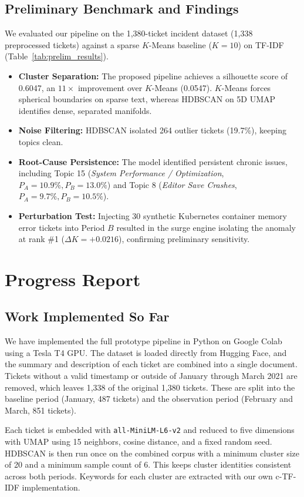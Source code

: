 \documentclass[sigconf,nonacm]{acmart}
\begin{document}
\subsection{Preliminary Benchmark and Findings}
We evaluated our pipeline on the 1,380-ticket incident dataset (1,338 preprocessed tickets) against a sparse $K$-Means baseline ($K = 10$) on TF-IDF (Table~\ref{tab:prelim_results}).
\begin{itemize}
    \item \textbf{Cluster Separation:} The proposed pipeline achieves a silhouette score of 0.6047, an $11\times$ improvement over $K$-Means (0.0547). $K$-Means forces spherical boundaries on sparse text, whereas HDBSCAN on 5D UMAP identifies dense, separated manifolds.
    \item \textbf{Noise Filtering:} HDBSCAN isolated 264 outlier tickets (19.7\%), keeping topics clean.
    \item \textbf{Root-Cause Persistence:} The model identified persistent chronic issues, including Topic 15 (\textit{System Performance / Optimization}, $P_A = 10.9\%, P_B = 13.0\%$) and Topic 8 (\textit{Editor Save Crashes}, $P_A = 9.7\%, P_B = 10.5\%$).
    \item \textbf{Perturbation Test:} Injecting 30 synthetic Kubernetes container memory error tickets into Period $B$ resulted in the surge engine isolating the anomaly at rank \#1 ($\Delta K = +0.0216$), confirming preliminary sensitivity.
\end{itemize}

\section{Progress Report}

\subsection{Work Implemented So Far}
We have implemented the full prototype pipeline in Python on Google Colab using a Tesla T4 GPU. The dataset is loaded directly from Hugging Face, and the summary and description of each ticket are combined into a single document. Tickets without a valid timestamp or outside of January through March 2021 are removed, which leaves 1,338 of the original 1,380 tickets. These are split into the baseline period (January, 487 tickets) and the observation period (February and March, 851 tickets).

Each ticket is embedded with \texttt{all-MiniLM-L6-v2} and reduced to five dimensions with UMAP using 15 neighbors, cosine distance, and a fixed random seed. HDBSCAN is then run once on the combined corpus with a minimum cluster size of 20 and a minimum sample count of 6. This keeps cluster identities consistent across both periods. Keywords for each cluster are extracted with our own c-TF-IDF implementation.
\end{document}
